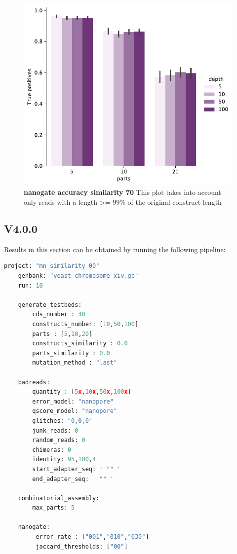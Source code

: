 \documentclass[11pt, a4paper]{article}
\begin{document}
\begin{figure}[ht]
    \begin{center}
    \includegraphics[width=1\textwidth]{../results/images_notebook/v_340/70_nanogate_good_reads_true_positves.pdf}
    \end{center}
    \caption{{\bf nanogate accuracy similarity 70} This plot takes into account only reads with a length >= $99\%$ of the
    original construct length }
   \label{fig:v_340_nanogate_accuracy_sim_70}
\end{figure}

\clearpage
\subsection{V4.0.0 }
Results in this section can be obtained by running the following pipeline:
\begin{lstlisting}[language=Python]
    project: "mn_similarity_00"
    genbank: "yeast_chromosome_xiv.gb"
    run: 10
    
    generate_testbeds:
        cds_number : 30
        constructs_number: [10,50,100]
        parts : [5,10,20]
        constructs_similarity : 0.0
        parts_similarity : 0.0
        mutation_method : "last"
    
    badreads:
        quantity : [5x,10x,50x,100x]
        error_model: "nanopore"
        qscore_model: "nanopore"
        glitches: "0,0,0"
        junk_reads: 0
        random_reads: 0
        chimeras: 0
        identity: 95,100,4
        start_adapter_seq: ' "" '
        end_adapter_seq: ' "" '
    
    combinatorial_assembly:
        max_parts: 5
    
    nanogate:
         error_rate : ["001","010","030"]
         jaccard_thresholds: ["00"]

\end{lstlisting}
\end{document}
